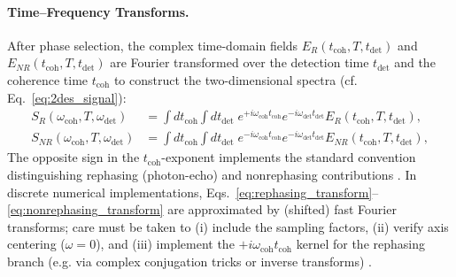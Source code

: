 \paragraph{Time--Frequency Transforms.}
\noindent After phase selection, the complex time-domain fields $E_{R}(t_{\text{coh}}, T, t_{\text{det}})$ and $E_{NR}(t_{\text{coh}}, T, t_{\text{det}})$ are Fourier transformed over the detection time $t_{\text{det}}$ and the coherence time $t_{\text{coh}}$ to construct the two-dimensional spectra (cf. Eq.~\eqref{eq:2des_signal}):
\begin{align}
	S_{R}(\omega_{\text{coh}}, T, \omega_{\text{det}})
	 & =
	\int dt_{\text{coh}} \int dt_{\text{det}} \;
	e^{+ i \omega_{\text{coh}} t_{\text{coh}}} e^{- i \omega_{\text{det}} t_{\text{det}}}
	E_{R}(t_{\text{coh}}, T, t_{\text{det}}),
	\label{eq:rephasing_transform} \\
	S_{NR}(\omega_{\text{coh}}, T, \omega_{\text{det}})
	 & =
	\int dt_{\text{coh}} \int dt_{\text{det}} \;
	e^{- i \omega_{\text{coh}} t_{\text{coh}}} e^{- i \omega_{\text{det}} t_{\text{det}}}
	E_{NR}(t_{\text{coh}}, T, t_{\text{det}}),
	\label{eq:nonrephasing_transform}
\end{align}
The opposite sign in the $t_{\text{coh}}$-exponent implements the standard convention distinguishing rephasing (photon-echo) and nonrephasing contributions \cite{cho2009twodimensionalopticalspectroscopy, greenetal2024vibrationalcoherenceshalfbroadband}. In discrete numerical implementations, Eqs.~\eqref{eq:rephasing_transform}--\eqref{eq:nonrephasing_transform} are approximated by (shifted) fast Fourier transforms; care must be taken to (i) include the sampling factors, (ii) verify axis centering ($\omega=0$), and (iii) implement the $+i\omega_{\text{coh}} t_{\text{coh}}$ kernel for the rephasing branch (e.g. via complex conjugation tricks or inverse transforms) \cite{cho2009twodimensionalopticalspectroscopy, greenetal2024vibrationalcoherenceshalfbroadband}.


